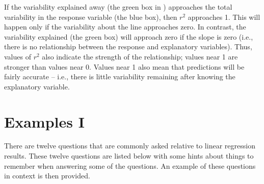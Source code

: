 \documentclass[10pt,openany]{book}\usepackage[]{graphicx}\usepackage[]{color}
\begin{document}
If the variability explained away (the green box in ) approaches the total variability in the response variable (the blue box), then $r^{2}$ approaches 1.  This will happen only if the variability about the line approaches zero.  In contrast, the variability explained (the green box) will approach zero if the slope is zero (i.e., there is no relationship between the response and explanatory variables).  Thus, values of $r^{2}$ also indicate the strength of the relationship; values near 1 are stronger than values near 0.  Values near 1 also mean that predictions will be fairly accurate -- i.e., there is little variability remaining after knowing the explanatory variable.



\section{Examples I}
There are twelve questions that are commonly asked relative to linear regression results.  These twelve questions are listed below with some hints about things to remember when answering some of the questions.  An example of these questions in context is then provided.
\end{document}
